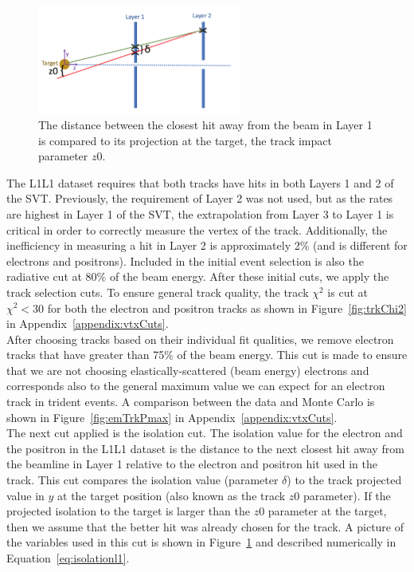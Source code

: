 \begin{figure}[htb]
  \centering
      \includegraphics[width=0.6\textwidth]{pics/searching/isolationPic.png}
  \caption[Track isolation cut]{The distance between the closest hit away from the beam in Layer 1 is compared to its projection at the target, the track impact parameter $z0$. }
  \label{fig:isoPic}
\end{figure}
The L1L1 dataset requires that both tracks have hits in both Layers 1 and 2 of the SVT. Previously, the requirement of Layer 2 was not used, but as the rates are highest in Layer 1 of the SVT, the extrapolation from Layer 3 to Layer 1 is critical in order to correctly measure the vertex of the track. Additionally, the inefficiency in measuring a hit in Layer 2 is approximately 2$\%$ (and is different for electrons and positrons). Included in the initial event selection is also the radiative cut at 80$\%$ of the beam energy. After these initial cuts, we apply the track selection cuts. To ensure general track quality, the track $\chi^2$ is cut at $\chi^2<30$ for both the electron and positron tracks as shown in Figure~\ref{fig:trkChi2} in Appendix~\ref{appendix:vtxCuts}.\\
\indent After choosing tracks based on their individual fit qualities, we remove electron tracks that have greater than 75$\%$ of the beam energy. This cut is made to ensure that we are not choosing elastically-scattered (beam energy) electrons and corresponds also to the general maximum value we can expect for an electron track in trident events. A comparison between the data and Monte Carlo is shown in Figure~\ref{fig:emTrkPmax} in Appendix~\ref{appendix:vtxCuts}. \\
\indent The next cut applied is the isolation cut. The isolation value for the electron and the positron in the L1L1 dataset is the distance to the next closest hit away from the beamline in Layer 1 relative to the electron and positron hit used in the track. This cut compares the isolation value (parameter $\delta$) to the track projected value in $y$ at the target position (also known as the track $z0$ parameter). If the projected isolation to the target is larger than the $z0$ parameter at the target, then we assume that the better hit was already chosen for the track. A picture of the variables used in this cut is shown in Figure~\ref{fig:isoPic} and described numerically in Equation~\eqref{eq:isolationl1}.

